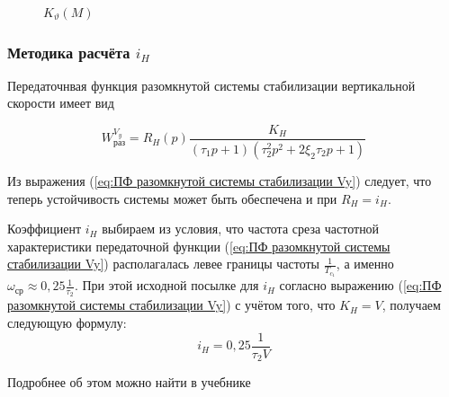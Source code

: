     \begin{figure}[H]
        \caption{$K_{\vartheta}(M) $}
        \label{fig:K_wz}
    \end{figure}
    
    \subsubsection{Методика расчёта $i_H$}
    
    Передаточнвая функция разомкнутой системы стабилизации вертикальной скорости имеет вид
    
    \begin{equation}
    \label{eq:ПФ разомкнутой системы стабилизации Vy}
        W^{V_y}_\text{раз}=R_H(p)\frac{K_H}{(\tau_1p+1)(\tau_2^2p^2+2\xi_2\tau_2p+1)}
    \end{equation}
    
    Из выражения (\ref{eq:ПФ разомкнутой системы стабилизации Vy}) следует, что теперь устойчивость системы может быть обеспечена и при $R_H = i_H$.
    
    Коэффициент $i_H$ выбираем из условия, что частота среза частотной характеристики передаточной функции (\ref{eq:ПФ разомкнутой системы стабилизации Vy}) располагалась левее границы частоты $\frac{1}{T_{c_1}}$, а именно $\omega_\text{ср} \approx 0,25\frac{1}{\tau_2}$. При этой исходной посылке для $i_H$ согласно выражению (\ref{eq:ПФ разомкнутой системы стабилизации Vy}) с учётом того, что $K_H = V$, получаем следующую формулу:
    \begin{equation}
        i_H = 0,25 \frac{1}{\tau_2 V}
    \end{equation}
    
    Подробнее об этом можно найти в учебнике \cite{UDLA}
    
